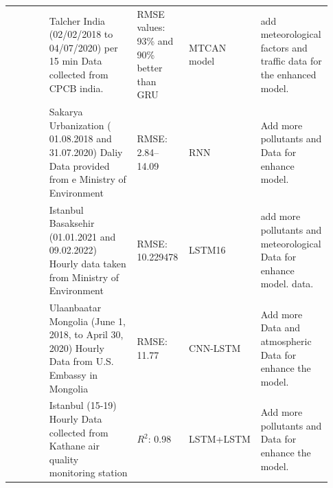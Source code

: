 \documentclass[a4paper, fleqn]{cas-sc}
\theoremstyle{definition}
\theoremstyle{remark}
\begin{document}
\begin{landscape}
{\begin{longtable}[h!]{ p{0.12\linewidth} p{0.27\linewidth} p{0.16\linewidth} p{0.16\linewidth} p{0.22\linewidth} }
 \cite{samal2021multi}  & Talcher India (02/02/2018 to   04/07/2020) per 15 min Data collected from CPCB india.                    & RMSE values:  93\%  and 90\% better than GRU                                                              & MTCAN model                                                         & add meteorological factors and traffic data for the enhanced model.                                                               \\


 \cite{kurnaz2022prediction}          & Sakarya Urbanization (   01.08.2018 and 31.07.2020) Daliy Data provided from e Ministry of Environment   & RMSE:  2.84–14.09                                                                                       & RNN                                                                 & Add more pollutants and Data for enhance model.    \\



 \cite{das2022prediction}           & Istanbul Basaksehir (01.01.2021   and 09.02.2022) Hourly data taken from Ministry of Environment         & RMSE: 10.229478                                                                                          & LSTM16                                                              & add more pollutants and  meteorological Data for enhance model. data.                                          \\
\cite{natsagdorj2023prediction}              & Ulaanbaatar Mongolia  (June 1,  2018, to  April 30,  2020) Hourly Data from U.S.   Embassy in Mongolia      & RMSE: 11.77                                                                                              & CNN-LSTM                                                            & Add more Data and atmospheric Data for enhance the model.  \\
 \cite{eren2023predicting}         & Istanbul (15-19) Hourly Data collected from Kathane air quality monitoring station                     & $R^2$:  0.98                                                                                               & LSTM+LSTM                                                           & Add more pollutants and Data for enhance the model.           \\





\end{longtable}}
\end{landscape}
\end{document}
